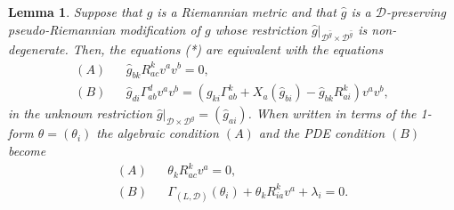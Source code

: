 \documentclass[11pt]{article}
\newtheorem{lem}{Lemma}
\def\D{{\mathcal D}}
\begin{document}
\begin{lem}   \label{prop:result}
 Suppose that $g$ is a Riemannian metric and that $\hat g$ is a $\D$-preserving pseudo-Riemannian modification of $g$ whose restriction ${\hat g}|_{\D^{\hat g} \times \D^{\hat g}}$ is non-degenerate. Then, the equations (*)  are equivalent with the equations 
\begin{eqnarray*} (A) && \hat{g}_{bk} R^k_{ac}v^a v^b=0,  \\[2mm]
(B) && 
 \hat{g}_{di}{\Gamma}^d_{ab}v^a v^b=(g_{ki}\Gamma^k_{ab}+
X_a(\hat{g}_{bi}) -\hat{g}_{bk} R^k_{ai})v^a v^b,
\end{eqnarray*}
 in the unknown restriction  ${\hat g}|_{\D \times \D^g} = ({\hat g}_{ai})$. When written in terms of the 1-form $\theta = (\theta_i)$ the algebraic condition $(A)$ and the PDE condition $(B)$ become
\begin{eqnarray*} 
(A) && \theta_k R^k_{ac} v^a =0,\\
  (B) &&  \Gamma_{(L,\mathcal{D})}(\theta_i)+\theta_k R^k_{ia}v^a +\lambda_i=0.
	\end{eqnarray*}
\end{lem}
\end{document}
